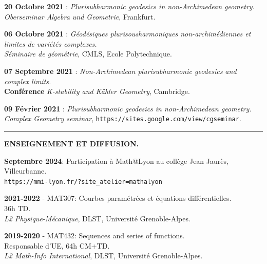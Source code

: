 \documentclass{article}
\theoremstyle{definition}
\theoremstyle{definition}
\theoremstyle{definition}
\newcommand\bsni{\bigskip\noindent}
\begin{document}
\bsni \textbf{20 Octobre 2021} : \textit{Plurisubharmonic geodesics in non-Archimedean geometry.}\\
\textit{Oberseminar Algebra und Geometrie}, Frankfurt.

\bsni \textbf{06 Octobre 2021} : \textit{Géodésiques plurisousharmoniques non-archimédiennes et limites de variétés complexes.}\\
\textit{Séminaire de géométrie}, CMLS, Ecole Polytechnique.

\bsni \textbf{07 Septembre 2021} : \textit{Non-Archimedean plurisubharmonic geodesics and complex limits.}\\
\textbf{Conférence} \textit{K-stability and Kähler Geometry}, Cambridge.

\bsni \textbf{09 Février 2021} : \textit{Plurisubharmonic geodesics in non-Archimedean geometry.}\\
\textit{Complex Geometry seminar}, \verb|https://sites.google.com/view/cgseminar|.


\bsni

\par\noindent\rule{\textwidth}{0.4pt}
\textbf{ENSEIGNEMENT ET DIFFUSION.}

\bsni \textbf{Septembre 2024}: Participation à Math@Lyon au collège Jean Jaurès, Villeurbanne.
\\ \verb|https://mmi-lyon.fr/?site_atelier=mathalyon|

\bsni \textbf{2021-2022} - MAT307: Courbes paramétrées et équations différentielles.\\ 
36h TD.\\
\textit{L2 Physique-Mécanique}, DLST, Université Grenoble-Alpes.

\bsni \textbf{2019-2020} - MAT432: Sequences and series of functions.\\
Responsable d'UE, 64h CM+TD.\\
\textit{L2 Math-Info International}, DLST, Université Grenoble-Alpes.
\end{document}
